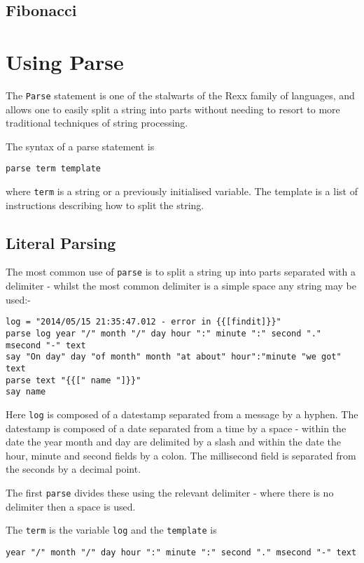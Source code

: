 {\section{Fibonacci}

\chapter{Using Parse}
The \texttt{Parse} statement is one of the stalwarts of the Rexx
family of languages, and allows one to easily split a string into parts without needing to resort to more traditional techniques of string processing.

The syntax of a parse statement is 

\begin{verbatim}
parse term template 
\end{verbatim}
where \texttt{term} is a string or a previously initialised variable. The template is a list of instructions describing how to split the string.

\section{Literal Parsing}
The most common use of \texttt{parse} is to split a string up into parts separated with a delimiter - whilst the most common delimiter is a simple space any string may be used:-

\begin{lstlisting}[label=SimpleParseExample, caption=Simple Parse Example]
log = "2014/05/15 21:35:47.012 - error in {{[findit]}}"
parse log year "/" month "/" day hour ":" minute ":" second "." msecond "-" text
say "On day" day "of month" month "at about" hour":"minute "we got" text
parse text "{{[" name "]}}"
say name
\end{lstlisting}

Here \texttt{log}  is composed of a datestamp separated from a message by a hyphen. The datestamp is composed of a date separated from a time by a space - within the date the year month and day are delimited by a slash and within the date the hour, minute and second fields by a colon. The millisecond field is separated from the seconds by a decimal point.

The first \texttt{parse} divides these using the relevant delimiter - where there is no delimiter then a space is used.

The \texttt{term} is the variable \texttt{log} and the \texttt{template} is 
\begin{verbatim}
year "/" month "/" day hour ":" minute ":" second "." msecond "-" text
\end{verbatim}

}
